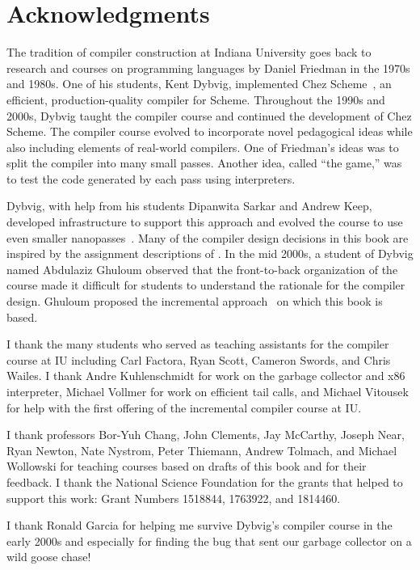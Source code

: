 \documentclass[7x10]{TimesAPriori_MIT}%
\numberwithin{theorem}{chapter}
\numberwithin{definition}{chapter}
\numberwithin{equation}{chapter}
\begin{document}
\section*{Acknowledgments}

The tradition of compiler construction at Indiana University goes back
to research and courses on programming languages by Daniel Friedman in
the 1970s and 1980s.  One of his students, Kent Dybvig, implemented
Chez Scheme~\citep{Dybvig:2006aa}, an efficient, production-quality
compiler for Scheme.  Throughout the 1990s and 2000s, Dybvig taught
the compiler course and continued the development of Chez Scheme.
%
The compiler course evolved to incorporate novel pedagogical ideas
while also including elements of real-world compilers.  One of
Friedman's ideas was to split the compiler into many small
passes. Another idea, called ``the game,'' was to test the code
generated by each pass using interpreters.

Dybvig, with help from his students Dipanwita Sarkar and Andrew Keep,
developed infrastructure to support this approach and evolved the
course to use even smaller
nanopasses~\citep{Sarkar:2004fk,Keep:2012aa}.  Many of the compiler
design decisions in this book are inspired by the assignment
descriptions of \citet{Dybvig:2010aa}. In the mid 2000s, a student of
Dybvig named Abdulaziz Ghuloum observed that the front-to-back
organization of the course made it difficult for students to
understand the rationale for the compiler design. Ghuloum proposed the
incremental approach~\citep{Ghuloum:2006bh} on which this book is
based.

I thank the many students who served as teaching assistants for the
compiler course at IU including Carl Factora, Ryan Scott, Cameron
Swords, and Chris Wailes. I thank Andre Kuhlenschmidt for work on the
garbage collector and x86 interpreter, Michael Vollmer for work on
efficient tail calls, and Michael Vitousek for help with the first
offering of the incremental compiler course at IU.

I thank professors Bor-Yuh Chang, John Clements, Jay McCarthy, Joseph
Near, Ryan Newton, Nate Nystrom, Peter Thiemann, Andrew Tolmach, and
Michael Wollowski for teaching courses based on drafts of this book
and for their feedback. I thank the National Science Foundation for
the grants that helped to support this work: Grant Numbers 1518844,
1763922, and 1814460.

I thank Ronald Garcia for helping me survive Dybvig's compiler
course in the early 2000s and especially for finding the bug that
sent our garbage collector on a wild goose chase!
\end{document}
